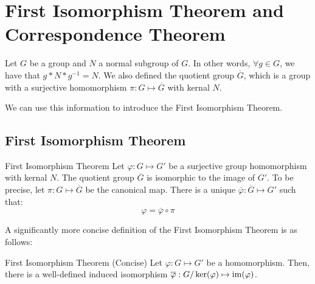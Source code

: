\documentclass[letterpaper]{article}
\begin{document}
\newpage 
\section{First Isomorphism Theorem and Correspondence Theorem}
Let $G$ be a group and $N$ a normal subgroup of $G$. In other words, $\forall g \in G$, we have that $g * N * g^{-1} = N$. We also defined the quotient group $\overline{G}$, which is a group with a surjective homomorphism $\pi: G \mapsto \overline{G}$ with kernal $N$.

\bigskip 

We can use this information to introduce the First Isomorphism Theorem. 

\subsection{First Isomorphism Theorem}
\begin{theorem}{First Isomorphism Theorem}{}
    Let $\varphi: G \mapsto G'$ be a surjective group homomorphism with kernal $N$. The quotient group $\overline{G}$ is isomorphic to the image of $G'$. To be precise, let $\pi: G \mapsto \overline{G}$ be the canonical map. There is a unique $\overline{\varphi}: \overline{G} \mapsto G'$ such that:
    \[\varphi = \overline{\varphi} \circ \pi\] 
\end{theorem}
A significantly more concise definition of the First Isomorphism Theorem is as follows: 
\begin{theorem}{First Isomorphism Theorem (Concise)}{}
    Let $\varphi: G \mapsto G'$ be a homomorphism. Then, there is a well-defined induced isomorphism $\overline{\varphi}: G / \ker(\varphi) \mapsto \operatorname{im}(\varphi)$. 
\end{theorem}
\end{document}
